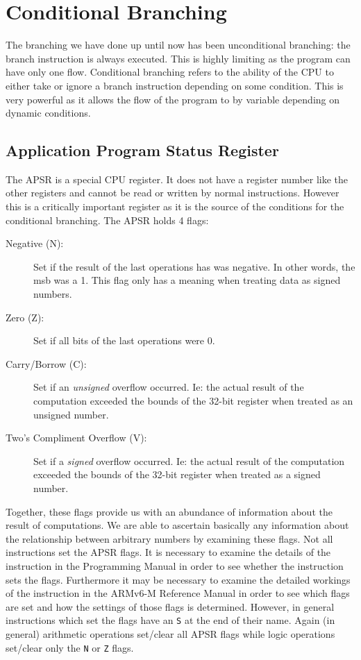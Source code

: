 \chapter{Conditional Branching}
The branching we have done up until now has been unconditional branching: the branch instruction is always executed. This is highly limiting as the program can have only one flow. Conditional branching refers to the ability of the CPU to either take or ignore a branch instruction depending on some condition. This is very powerful as it allows the flow of the program to by variable depending on dynamic conditions. 

\section{Application Program Status Register}
The APSR is a special CPU register. It does not have a register number like the other registers and cannot be read or written by normal instructions. However this is a critically important register as it is the source of the conditions for the conditional branching. The APSR holds 4 flags:
\begin{description}
\item[Negative (N):] Set if the result of the last operations has was negative. In other words, the msb was a 1. This flag only has a meaning when treating data as signed numbers. 
\item[Zero (Z):] Set if all bits of the last operations were 0.
\item[Carry/Borrow (C):] Set if an \emph{unsigned} overflow occurred. Ie: the actual result of the computation exceeded the bounds of the 32-bit register when treated as an unsigned number.
\item[Two's Compliment Overflow (V):] Set if a \emph{signed} overflow occurred. Ie: the actual result of the computation exceeded the bounds of the 32-bit register when treated as a signed number. 
\end{description}

Together, these flags provide us with an abundance of information about the result of computations. We are able to ascertain basically any information about the relationship between arbitrary numbers by examining these flags. Not all instructions set the APSR flags. It is necessary to examine the details of the instruction in the Programming Manual in order to see whether the instruction sets the flags. Furthermore it may be necessary to examine the detailed workings of the instruction in the ARMv6-M Reference Manual in order to see which flags are set and how the settings of those flags is determined. However, in general instructions which set the flags have an \texttt{S} at the end of their name. Again (in general) arithmetic operations set/clear all APSR flags while logic operations set/clear only the \texttt{N} or \texttt{Z} flags. 


